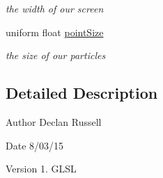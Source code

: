 \begin{DoxyCompactItemize}
\begin{DoxyCompactList}\small\item\em the width of our screen \end{DoxyCompactList}\item 
\hypertarget{particle_depth_vert_8glsl_a9550a4bf60e3039a98ab946ba37ae067}{uniform float \hyperlink{particle_depth_vert_8glsl_a9550a4bf60e3039a98ab946ba37ae067}{point\-Size}}\label{particle_depth_vert_8glsl_a9550a4bf60e3039a98ab946ba37ae067}

\begin{DoxyCompactList}\small\item\em the size of our particles \end{DoxyCompactList}\end{DoxyCompactItemize}


\subsection{Detailed Description}
\begin{DoxyAuthor}{Author}
Declan Russell 
\end{DoxyAuthor}
\begin{DoxyDate}{Date}
8/03/15 
\end{DoxyDate}
\begin{DoxyVersion}{Version}
1.  G\-L\-S\-L 
\end{DoxyVersion}
